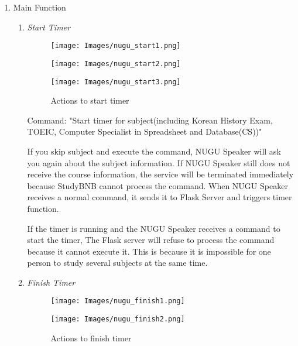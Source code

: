 \documentclass[conference]{IEEEtran}
\begin{document}
\begin{enumerate}
\begin{enumerate}
    \end{enumerate}

    
    
    \item Main Function
    \begin{enumerate}
        \item \textit{Start Timer}
        
        \begin{figure}[H]
    \centering
    \texttt{[image: Images/nugu\_start1.png]}
\end{figure}
        \begin{figure}[H]
    \centering
    \texttt{[image: Images/nugu\_start2.png]}
\end{figure}
        \begin{figure}[H]
    \centering
    \texttt{[image: Images/nugu\_start3.png]}
    \caption{Actions to start timer}
\end{figure}
        
        Command: "Start timer for subject(including Korean History Exam, TOEIC, Computer Specialist in Spreadsheet and Database(CS))"
        
If you skip subject and execute the command, NUGU Speaker will ask you again about the subject information. If NUGU Speaker still does not receive the course information, the service will be terminated immediately because StudyBNB cannot process the command. When NUGU Speaker receives a normal command, it sends it to Flask Server and triggers timer function.

If the timer is running and the NUGU Speaker receives a command to start the timer, The Flask server will refuse to process the command because it cannot execute it. This is because it is impossible for one person to study several subjects at the same time.\\

        
        \item \textit{Finish Timer}
        
                \begin{figure}[H]
    \centering
    \texttt{[image: Images/nugu\_finish1.png]}
\end{figure}

        \begin{figure}[H]
    \centering
    \texttt{[image: Images/nugu\_finish2.png]}
    \caption{Actions to finish timer}
\end{figure}


\end{enumerate}
\end{enumerate}
\end{document}
